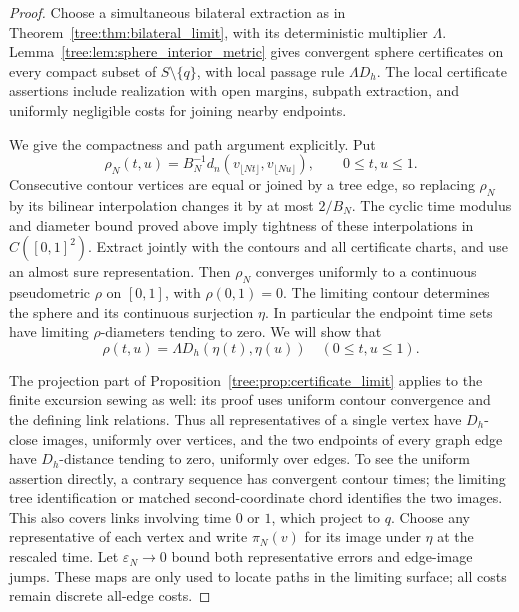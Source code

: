 \begin{proof}
Choose a simultaneous bilateral extraction as in
Theorem~\ref{tree:thm:bilateral_limit}, with its deterministic multiplier
$\Lambda$. Lemma~\ref{tree:lem:sphere_interior_metric} gives convergent
sphere certificates on every compact subset of $S\setminus\{q\}$,
with local passage rule $\Lambda D_h$. The local
certificate assertions include realization with open margins, subpath
extraction, and uniformly negligible costs for joining nearby endpoints.

We give the compactness and path argument explicitly.  Put
\[
 \rho_N(t,u)=B_N^{-1}d_n(v_{\lfloor Nt\rfloor},v_{\lfloor Nu\rfloor}),
                    \qquad 0\leq t,u\leq1.
\]
Consecutive contour vertices are equal or joined by a tree edge, so
replacing $\rho_N$ by its bilinear interpolation changes it by at most
$2/B_N$.  The cyclic time modulus and diameter bound proved above imply
tightness of these interpolations in $C([0,1]^2)$.  Extract jointly with
the contours and all certificate charts, and use an almost sure
representation.  Then $\rho_N$ converges uniformly to a continuous
pseudometric $\rho$ on $[0,1]$, with $\rho(0,1)=0$.  The limiting
contour determines the sphere and its continuous surjection $\eta$.
In particular the endpoint time sets have limiting $\rho$-diameters
tending to zero.  We will show that
\begin{equation}\label{tree:eq:sphere_uniform_identification}
                       \rho(t,u)=\Lambda D_h(\eta(t),\eta(u))
                       \quad(0\leq t,u\leq1).
\end{equation}

The projection part of Proposition~\ref{tree:prop:certificate_limit} applies
to the finite excursion sewing as well: its proof uses uniform contour
convergence and the defining link relations.  Thus all representatives
of a single vertex have $D_h$-close images, uniformly over vertices, and
the two endpoints of every graph edge have $D_h$-distance tending to
zero, uniformly over edges.  To see the uniform assertion directly,
a contrary sequence has convergent contour times; the limiting tree
identification or matched second-coordinate chord identifies the two
images.  This also covers links involving time $0$ or $1$, which
project to $q$.  Choose any representative of each vertex and write
$\pi_N(v)$ for its image under $\eta$ at the rescaled time.  Let
$\varepsilon_N\to0$ bound both representative errors and edge-image
jumps.  These maps are only used to locate paths in the limiting
surface; all costs remain discrete all-edge costs.


\end{proof}
